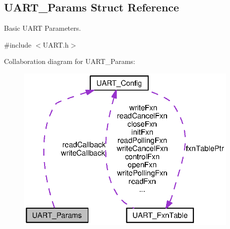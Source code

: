 \subsection{U\-A\-R\-T\-\_\-\-Params Struct Reference}
\label{struct_u_a_r_t___params}


Basic U\-A\-R\-T Parameters.  




{\ttfamily \#include $<$U\-A\-R\-T.\-h$>$}



Collaboration diagram for U\-A\-R\-T\-\_\-\-Params\-:
\nopagebreak
\begin{figure}[H]
\begin{center}
\leavevmode
\includegraphics[width=306pt]{struct_u_a_r_t___params__coll__graph}
\end{center}
\end{figure}
